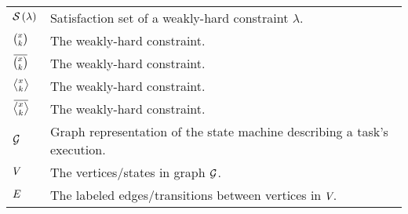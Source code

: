 \begin{table*}[h]
\begin{tabular}{l|l}
        $\mathcal{S}_{}\left( \lambda \right)$ & Satisfaction set of a weakly-hard constraint $\lambda$. \\
        $\binom{x_{}}{k_{}}$ & The \tAH{} weakly-hard constraint. \\
        $\anymiss{}$ & The \tAM{} weakly-hard constraint. \\
        $\rowhit{}$ & The \tRH{} weakly-hard constraint. \\
        $\rowmiss{}$ & The \tRM{} weakly-hard constraint. \\
        $\mathcal{G}_{}$ & Graph representation of the state machine describing a task's execution. \\
        $V_{}$ & The vertices/states in graph $\mathcal{G}_{}$. \\
        $E_{}$ & The labeled edges/transitions between vertices in $V_{}$. \\
    \end{tabular}
\end{table*}
